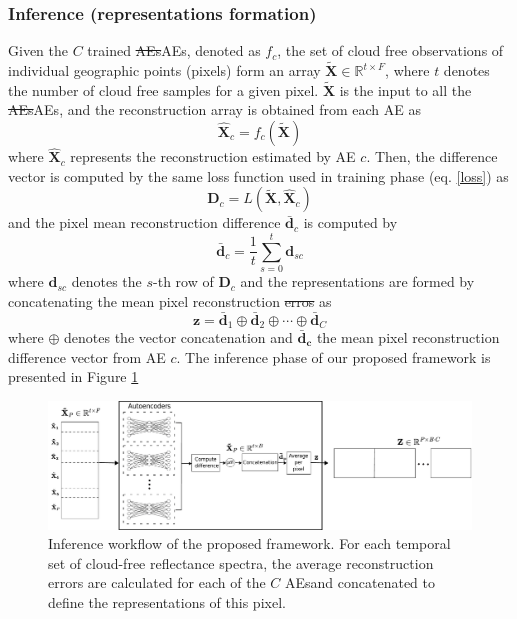 \documentclass[journal,article,submit,pdftex,moreauthors]{Definitions/mdpi}
\providecommand{\DIFadd}[1]{{\protect\color{blue}\uwave{#1}}} %
\providecommand{\DIFdel}[1]{{\protect\color{red}\sout{#1}}}                      %
\providecommand{\DIFaddbegin}{} %
\providecommand{\DIFaddend}{} %
\providecommand{\DIFdelbegin}{} %
\providecommand{\DIFdelend}{} %
\providecommand{\DIFaddFL}[1]{\DIFadd{#1}} %
\providecommand{\DIFaddbeginFL}{} %
\providecommand{\DIFaddendFL}{} %
\begin{document}
\subsubsection{Inference (representations formation)}
Given the $C$ trained \DIFdelbegin \DIFdel{AEs}\DIFdelend \DIFaddbegin \ac{AEs}\DIFaddend , denoted as $f_c$, the set of cloud free observations of individual geographic points (pixels) form an array $\mathbf{\tilde{X}} \in \mathbb{R}^{t \times F}$, where $t$ denotes the number of cloud free samples for a given pixel. $\mathbf{\tilde{X}}$ is the input to all the \DIFdelbegin \DIFdel{AEs}\DIFdelend \DIFaddbegin \ac{AEs}\DIFaddend , and the reconstruction array is obtained from each AE as
\begin{equation}
	\mathbf{\hat{X}}_c = f_c(\mathbf{\tilde{X}}) 
\end{equation}
where $\mathbf{\hat{X}}_c$ represents the reconstruction estimated by AE $c$. Then, the difference vector is computed by the same loss function used in training phase (eq. \ref{loss}) as
\begin{equation}
    \mathbf{D}_c = L(\mathbf{\tilde{X}}, \mathbf{\hat{X}}_c)
\end{equation}
and the pixel mean reconstruction difference $\mathbf{\bar{d}}_c$ is computed by
\begin{equation}
	\mathbf{\bar{d}}_c = \frac{1}{t}\sum_{s=0}^{t}\mathbf{d}_{sc}
\end{equation} 
where $\mathbf{d}_{sc}$ denotes the $s$-th row of $\mathbf{D}_c$ and the representations are formed by concatenating the mean pixel reconstruction \DIFdelbegin \DIFdel{erros }\DIFdelend \DIFaddbegin \DIFadd{difference }\DIFaddend as
\begin{equation}
    \mathbf{z}=\mathbf{\bar{d}}_1 \oplus \mathbf{\bar{d}}_2 \oplus \cdots \oplus \mathbf{\bar{d}}_C
\end{equation}
where $\oplus$ denotes the vector concatenation and $\mathbf{\bar{d}_c}$ the mean pixel reconstruction difference vector from AE $c$.
The inference phase of our proposed framework is presented in Figure \ref{Inference}
\begin{figure}[H]
	\centering
	\includegraphics[width=\textwidth]{figures/testing.pdf}
	\caption{Inference workflow of the proposed framework. For each temporal set of cloud-free reflectance spectra, the average reconstruction errors are calculated for each of the $C$ \DIFaddbeginFL \DIFaddFL{autoencoders (}\DIFaddendFL AEs\DIFaddbeginFL \DIFaddFL{) }\DIFaddendFL and concatenated to define the representations of this pixel.}
	\label{Inference}    
\end{figure}
\end{document}
